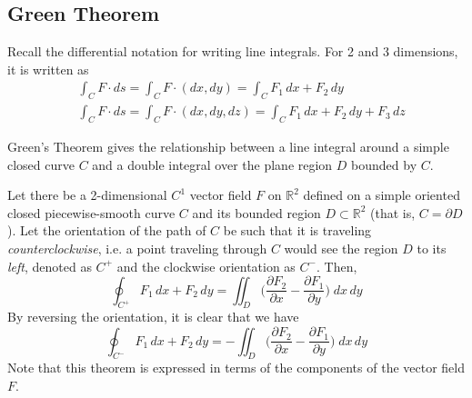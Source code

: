 \subsection{Green Theorem}
		
  Recall the differential notation for writing line integrals. For 2 and 3 dimensions, it is written as
  \begin{align}
		& \int_C F \cdot d s = \int_C F \cdot (d x, d y) = \int_C F_1 \, d x + F_2 \, d y \\
		& \int_C F \cdot d s = \int_C F \cdot (d x, d y, d z) = \int_C F_1 \, d x + F_2 \, d y + F_3 \, d z 
  \end{align}
		
		
  Green's Theorem gives the relationship between a line integral around a simple closed curve $C$ and a double integral over the plane region $D$ bounded by $C$. 
		
  \begin{theorem}
		Let there be a 2-dimensional $C^1$ vector field $F$ on $\mathbb{R}^2$ defined on a simple oriented closed piecewise-smooth curve $C$ and its bounded region $D \subset \mathbb{R}^2$ (that is, $C = \partial D$). Let the orientation of the path of $C$ be such that it is traveling \textit{counterclockwise}, i.e. a point traveling through $C$ would see the region $D$ to its \textit{left}, denoted as $C^+$ and the clockwise orientation as $C^-$.  Then, 
		\begin{equation}
			\oint_{C^+} F_1 \, d x + F_2 \, d y = \iint_D \bigg( \frac{\partial F_2}{\partial x} - \frac{\partial F_1}{\partial y} \bigg) \; d x \, d y
		\end{equation}
		By reversing the orientation, it is clear that we have
		\begin{equation}
			\oint_{C^-} F_1 \, d x + F_2 \, d y = - \iint_D \bigg( \frac{\partial F_2}{\partial x} - \frac{\partial F_1}{\partial y} \bigg) \; d x \, d y
		\end{equation}
		Note that this theorem is expressed in terms of the components of the vector field $F$. 
		\begin{center}
		\end{center}
  \end{theorem}
		
